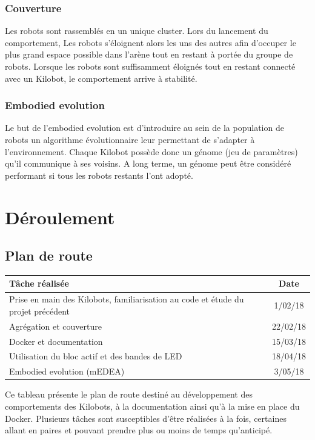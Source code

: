 \documentclass[a4paper]{article}
\begin{document}
\subsubsection{Couverture}

Les robots sont rassemblés en un unique cluster. Lors du lancement du comportement, Les
robots s’éloignent alors les uns des autres afin d’occuper le plus grand espace possible dans l’arène
tout en restant à portée du groupe de robots.
Lorsque les robots sont suffisamment éloignés tout en restant connecté avec un Kilobot, le comportement arrive à stabilité.

\subsubsection{Embodied evolution}

Le but de l'embodied evolution est d'introduire au sein de la population de robots un algorithme évolutionnaire leur permettant de s'adapter à l'environnement. Chaque Kilobot possède donc un génome (jeu de paramètres) qu'il communique à ses voisins. A long terme, un génome peut être considéré performant si tous les robots restants l'ont adopté.

\section{Déroulement}

\subsection{Plan de route}

\begin{center}
    \begin{tabular}{ | p{5cm} | c | }
    \hline
    Tâche réalisée & Date\\ \hline
    Prise en main des Kilobots, familiarisation au code et étude du projet précédent  & 1/02/18\\ \hline
    Agrégation et couverture & 22/02/18\\ \hline
	Docker et documentation & 15/03/18\\ \hline
    Utilisation du bloc actif et des bandes de LED & 18/04/18\\ \hline
    Embodied evolution (mEDEA) & 3/05/18\\ \hline
    \end{tabular}
\end{center}

Ce tableau présente le plan de route destiné au développement des comportements des Kilobots, à la documentation ainsi qu'à la mise en place du Docker. Plusieurs tâches sont susceptibles d'être réalisées à la fois, certaines allant en paires et pouvant prendre plus ou moins de temps qu'anticipé.
\end{document}
